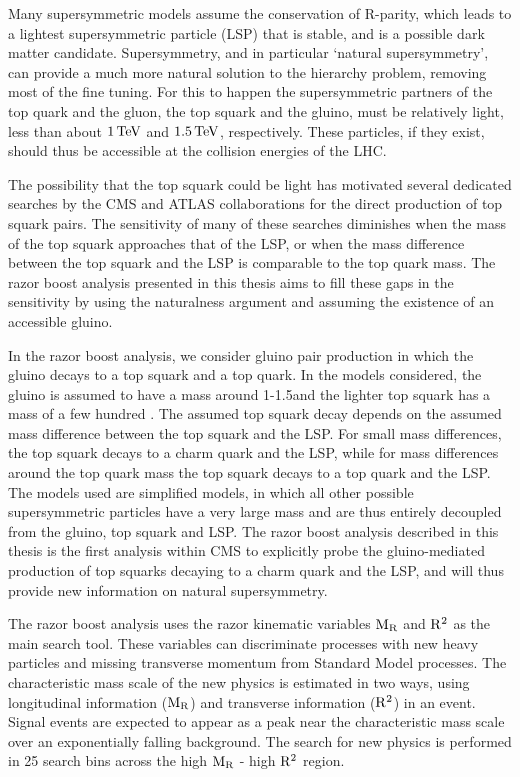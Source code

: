 Many supersymmetric models assume the conservation of R-parity, which leads to a lightest
supersymmetric particle (LSP) that is stable, and is a possible dark matter candidate. 
Supersymmetry, and in particular `natural supersymmetry', can provide a much more natural solution
to the hierarchy problem, removing most of the fine tuning. For this to happen the supersymmetric
partners of the top quark and the gluon, the top squark and the gluino, must be relatively light,
less than about $1\,\text{Te\hspace{-.08em}V}$ and $1.5\,\text{Te\hspace{-.08em}V}$, respectively. These particles, if they exist, should thus be
accessible at the collision energies of the LHC. 


The possibility that the top squark could be light has motivated several dedicated searches by the
CMS and ATLAS collaborations for the direct production of top squark pairs. 
The sensitivity of many of these searches diminishes when the mass of the top squark approaches that
of the LSP, or when the mass difference between the top squark and the LSP is comparable to the top
quark mass. The razor boost analysis presented in this thesis aims to fill these gaps in the
sensitivity by using the naturalness argument and assuming the existence of an accessible gluino. 


In the razor boost analysis, we consider gluino pair production in which the gluino decays to a top
squark and a top quark. In the models considered, the gluino is assumed to have a mass around
1-1.5\TeV and the lighter top squark has a mass of a few hundred \GeV.
The assumed top squark decay depends on the assumed mass difference between the top squark and
the LSP.
For small mass differences, the top squark decays to a charm quark and the LSP, while for mass
differences around the top quark mass the top squark decays to a top quark and the LSP. 
The models used are simplified models, in which all other possible supersymmetric particles
have a very large mass and are thus entirely decoupled from the gluino, top squark and LSP. 
The razor boost analysis described in this thesis is the first analysis within CMS to explicitly
probe the gluino-mediated production of top squarks decaying to a charm quark and the LSP, and
will thus provide new information on natural supersymmetry. 


The razor boost analysis uses the razor kinematic variables $\mathrm{M_R}$ and $\mathrm{R^2}$ as the main search
tool. These variables can discriminate processes with new heavy particles and missing transverse
momentum from Standard Model processes. The characteristic mass scale of the new physics is
estimated in two ways, using longitudinal information ($\mathrm{M_R}$) and transverse information ($\mathrm{R^2}$)
in an event. 
Signal events are expected to appear as a peak near the characteristic mass scale over an
exponentially falling background. 
The search for new physics is performed in 25 search bins across the high $\mathrm{M_R}$ - high $\mathrm{R^2}$
region. 

